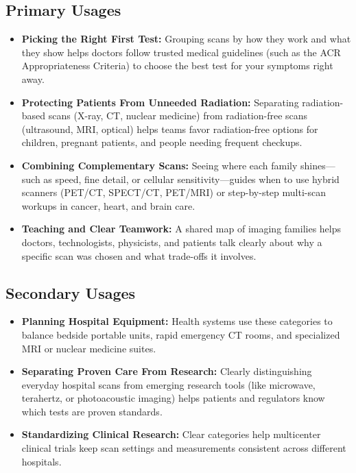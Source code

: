 \subsection{Primary Usages}
\begin{itemize}
  \item \textbf{Picking the Right First Test:} Grouping scans by how they work and what they show helps doctors follow trusted medical guidelines (such as the ACR Appropriateness Criteria) to choose the best test for your symptoms right away.
  \item \textbf{Protecting Patients From Unneeded Radiation:} Separating radiation-based scans (X-ray, CT, nuclear medicine) from radiation-free scans (ultrasound, MRI, optical) helps teams favor radiation-free options for children, pregnant patients, and people needing frequent checkups.
  \item \textbf{Combining Complementary Scans:} Seeing where each family shines---such as speed, fine detail, or cellular sensitivity---guides when to use hybrid scanners (PET/CT, SPECT/CT, PET/MRI) or step-by-step multi-scan workups in cancer, heart, and brain care.
  \item \textbf{Teaching and Clear Teamwork:} A shared map of imaging families helps doctors, technologists, physicists, and patients talk clearly about why a specific scan was chosen and what trade-offs it involves.
\end{itemize}

\subsection{Secondary Usages}
\begin{itemize}
  \item \textbf{Planning Hospital Equipment:} Health systems use these categories to balance bedside portable units, rapid emergency CT rooms, and specialized MRI or nuclear medicine suites.
  \item \textbf{Separating Proven Care From Research:} Clearly distinguishing everyday hospital scans from emerging research tools (like microwave, terahertz, or photoacoustic imaging) helps patients and regulators know which tests are proven standards.
  \item \textbf{Standardizing Clinical Research:} Clear categories help multicenter clinical trials keep scan settings and measurements consistent across different hospitals.
\end{itemize}

